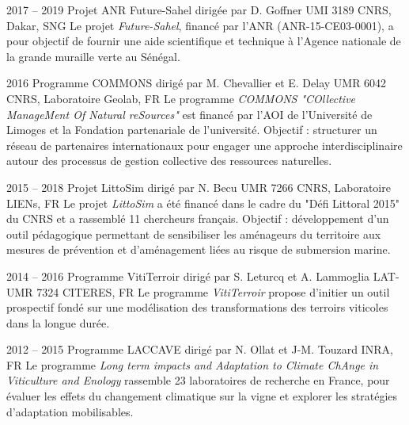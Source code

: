 \documentclass[]{cv-etienne}
\begin{document}
\begin{entrylist}
\entry
{2017 -- 2019}
{Projet ANR Future-Sahel {\normalfont dirigée par D. Goffner}}
{UMI 3189 CNRS, Dakar, SNG}
{Le projet \emph{Future-Sahel}, financé par l'ANR (ANR-15-CE03-0001), a pour objectif de fournir une aide scientifique et technique à l'Agence nationale de la grande muraille verte au Sénégal.}
\end{entrylist}
\begin{entrylist}
\entry
{2016}
{Programme COMMONS {\normalfont dirigé par M. Chevallier et E. Delay}}
{UMR 6042 CNRS, Laboratoire Geolab, FR}
{Le programme \emph{COMMONS "\textit{COllective ManageMent Of Natural reSources}"} est financé par l'AOI de l'Université de Limoges et la Fondation partenariale de l'université. Objectif : structurer un réseau de partenaires internationaux pour engager une approche interdisciplinaire autour des processus de gestion collective des ressources naturelles.}
\end{entrylist}
\begin{entrylist}
\entry
{2015 -- 2018}
{Projet LittoSim {\normalfont dirigé par N. Becu}}
{UMR 7266 CNRS, Laboratoire LIENs, FR}
{Le projet \emph{LittoSim} a été financé dans le cadre du "Défi Littoral 2015" du CNRS et a rassemblé 11 chercheurs français. Objectif : développement d'un outil pédagogique permettant de sensibiliser les aménageurs du territoire aux mesures de prévention et d'aménagement liées au risque de submersion marine.}
\end{entrylist}
\begin{entrylist}
\entry
{2014 -- 2016}
{Programme VitiTerroir {\normalfont dirigé par S. Leturcq et A. Lammoglia}}
{LAT-UMR 7324 CITERES, FR}
{Le programme \emph{VitiTerroir} propose d'initier un outil prospectif fondé sur une modélisation des transformations des terroirs viticoles dans la longue durée.}
\end{entrylist}
\begin{entrylist}
\entry
{2012 -- 2015}
{Programme LACCAVE {\normalfont dirigé par N. Ollat et J-M. Touzard}}
{INRA, FR}
{Le programme \emph{Long term impacts and Adaptation to Climate ChAnge in Viticulture and Enology} rassemble 23 laboratoires de recherche en France, pour évaluer les effets du changement climatique sur la vigne et explorer les stratégies d'adaptation mobilisables.}
\end{entrylist}
\end{document}
